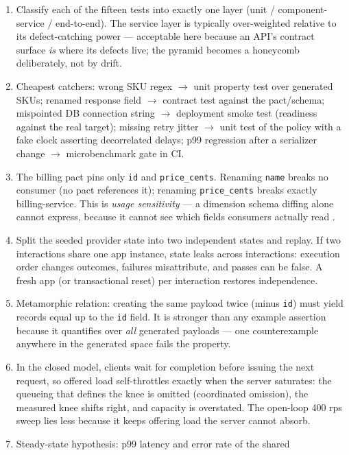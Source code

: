 \begin{enumerate}[label=\textbf{E-\arabic*.}, leftmargin=2.6em]
  \item Classify each of the fifteen tests into exactly one layer (unit /
    component-service / end-to-end). The service layer is typically
    over-weighted relative to its defect-catching power --- acceptable here
    because an API's contract surface \emph{is} where its defects live; the
    pyramid becomes a honeycomb deliberately, not by drift.
  \item Cheapest catchers: wrong SKU regex $\to$ unit property test over
    generated SKUs; renamed response field $\to$ contract test against the
    pact/schema; mispointed DB connection string $\to$ deployment smoke
    test (readiness against the real target); missing retry jitter $\to$
    unit test of the policy with a fake clock asserting decorrelated
    delays; p99 regression after a serializer change $\to$ microbenchmark
    gate in CI.
  \item The billing pact pins only \texttt{id} and \texttt{price\_cents}.
    Renaming \texttt{name} breaks no consumer (no pact references it);
    renaming \texttt{price\_cents} breaks exactly billing-service. This is
    \emph{usage sensitivity} --- a dimension schema diffing alone cannot
    express, because it cannot see which fields consumers actually read
    \cite{pactdocs}.
  \item Split the seeded provider state into two independent states and
    replay. If two interactions share one app instance, state leaks across
    interactions: execution order changes outcomes, failures misattribute,
    and passes can be false. A fresh app (or transactional reset) per
    interaction restores independence.
  \item Metamorphic relation: creating the same payload twice (minus
    \texttt{id}) must yield records equal up to the \texttt{id} field. It
    is stronger than any example assertion because it quantifies over
    \emph{all} generated payloads --- one counterexample anywhere in the
    generated space fails the property.
  \item In the closed model, clients wait for completion before issuing the
    next request, so offered load self-throttles exactly when the server
    saturates: the queueing that defines the knee is omitted
    (coordinated omission), the measured knee shifts right, and capacity is
    overstated. The open-loop 400 rps sweep lies less because it keeps
    offering load the server cannot absorb.
  \item Steady-state hypothesis: p99 latency and error rate of the shared

\end{enumerate}
